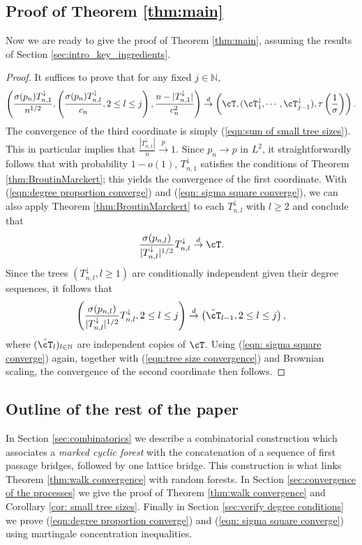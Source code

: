 \subsection{Proof of Theorem \ref{thm:main}}\label{sec:proof of main theorem}
Now we are ready to give the proof of Theorem \ref{thm:main}, assuming the results of Section \ref{sec:intro_key_ingredients}.
\begin{proof}
It suffices to prove that for any fixed $j\in\mathbb{N}$, 
\[\left(\frac{\sigma(p_n) T^\downarrow_{n,1}}{n^{1/2}}, \left(\frac{\sigma(p_n) T^\downarrow_{n,l}}{c_n}, 2\le l\le j\right), \frac{n-|T^\downarrow_{n,1}|}{c^2_n}\right)\overset{d}{\to}\left(\cT, (\cT^\downarrow_1,\cdots,\cT^\downarrow_{j-1}), \tau\left(\frac{1}{\sigma}\right)\right).\]
The convergence of the third coordinate is simply (\ref{eqn:sum of small tree sizes}). This in particular implies that $\frac{|T^\downarrow_{n,1}|}{n}\overset{p}{\to} 1$. Since $p_n\to p$ in $L^2$, it straightforwardly follows that with probability $1-o(1)$, $T^\downarrow_{n,1}$ satisfies the conditions of Theorem \ref{thm:BroutinMarckert}; this yields the convergence of the first coordinate. With (\ref{eqn:degree proportion converge}) and (\ref{eqn: sigma square converge}), we can also apply Theorem \ref{thm:BroutinMarckert} to each $T^\downarrow_{n,l}$ with $l\ge 2$ and conclude that
\[
\frac{\sigma(p_{n,l})}{|T^\downarrow_{n,l}|^{1/2}}T^\downarrow_{n,l}\overset{d}{\to}\cT.
\]
Since the trees $(T^\downarrow_{n,l}, l\ge 1)$ are conditionally independent given their degree sequences, it follows that 
\[\left(\frac{\sigma(p_{n,l})}{|T^\downarrow_{n,l}|^{1/2}}T^\downarrow_{n,l}, 2\le l\le j\right)\overset{d}{\to}\left(\tilde{\cT}_{l-1}, 2\le l\le j\right),\]
where $(\tilde{\cT}_l)_{l\in\mathbb{N}}$ are independent copies of $\cT$.
Using (\ref{eqn: sigma square converge}) again, together with (\ref{eqn:tree size convergence}) and Brownian scaling, the convergence of the second coordinate then follows.
\end{proof}

\subsection*{Outline of the rest of the paper}
In Section \ref{sec:combinatorics} we describe a combinatorial construction which associates a {\em marked cyclic forest} with the concatenation of a sequence of first passage bridges, followed by one lattice bridge. This construction is what links Theorem \ref{thm:walk convergence} with random forests. In Section \ref{sec:convergence of the processes} we give the proof of Theorem \ref{thm:walk convergence} and Corollary \ref{cor: small tree sizes}. Finally in Section \ref{sec:verify degree conditions} we prove (\ref{eqn:degree proportion converge}) and (\ref{eqn: sigma square converge}) using martingale concentration inequalities. 


